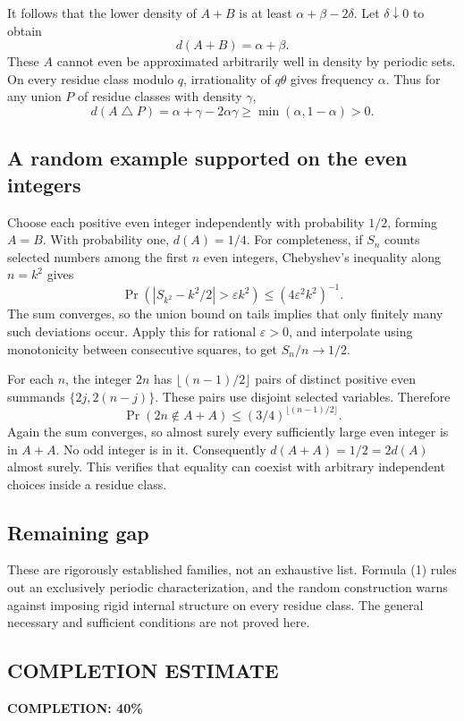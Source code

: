 It follows that the lower density of $A+B$ is at least $\alpha+\beta-2\delta$. Let $\delta\downarrow0$ to obtain
\[
 d(A+B)=\alpha+\beta.
\]
These $A$ cannot even be approximated arbitrarily well in density by periodic sets. On every residue class modulo $q$, irrationality of $q\theta$ gives frequency $\alpha$. Thus for any union $P$ of residue classes with density $\gamma$,
\[
 d(A\mathbin{\triangle}P)=\alpha+\gamma-2\alpha\gamma
 \ge\min(\alpha,1-\alpha)>0. \tag{1}
\]

\subsection*{A random example supported on the even integers}
Choose each positive even integer independently with probability $1/2$, forming $A=B$. With probability one, $d(A)=1/4$. For completeness, if $S_n$ counts selected numbers among the first $n$ even integers, Chebyshev's inequality along $n=k^2$ gives
\[
 \Pr(|S_{k^2}-k^2/2|>\varepsilon k^2)\le(4\varepsilon^2 k^2)^{-1}.
\]
The sum converges, so the union bound on tails implies that only finitely many such deviations occur. Apply this for rational $\varepsilon>0$, and interpolate using monotonicity between consecutive squares, to get $S_n/n\to1/2$.

For each $n$, the integer $2n$ has $\lfloor(n-1)/2\rfloor$ pairs of distinct positive even summands
$\{2j,2(n-j)\}$. These pairs use disjoint selected variables. Therefore
\[
 \Pr(2n\notin A+A)\le(3/4)^{\lfloor(n-1)/2\rfloor}.
\]
Again the sum converges, so almost surely every sufficiently large even integer is in $A+A$. No odd integer is in it. Consequently
$d(A+A)=1/2=2d(A)$ almost surely. This verifies that equality can coexist with arbitrary independent choices inside a residue class.

\subsection*{Remaining gap}
These are rigorously established families, not an exhaustive list. Formula (1) rules out an exclusively periodic characterization, and the random construction warns against imposing rigid internal structure on every residue class. The general necessary and sufficient conditions are not proved here.
\subsection*{COMPLETION ESTIMATE}
\textbf{COMPLETION: 40\%}
